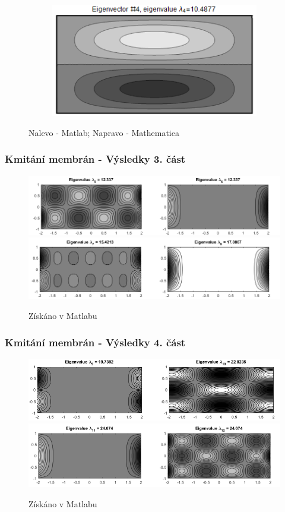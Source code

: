 \documentclass[xcolor=table]{beamer}
\begin{document}
\begin{frame}
\begin{figure}
\begin{subfigure}{.5\textwidth}
\includegraphics[width=.95\linewidth]{rectangle-eigenvector-4.png}
\end{subfigure}
\caption{Nalevo - Matlab; Napravo - Mathematica}
\end{figure}
\end{frame}

\begin{frame}
\frametitle{Kmitání membrán - Výsledky 3. část}
\centering
\begin{figure}
\includegraphics[width=1\linewidth]{obdelnicky3.png}
\includegraphics[width=1\linewidth]{obdelnicky4.png}
\caption{Získáno v Matlabu}
\end{figure}
\end{frame}

\begin{frame}
\frametitle{Kmitání membrán - Výsledky 4. část}
\centering
\begin{figure}
\includegraphics[width=1\linewidth]{obdelnicky5.png}
\includegraphics[width=1\linewidth]{obdelnicky6.png}
\caption{Získáno v Matlabu}
\end{figure}
\end{frame}
\end{document}
